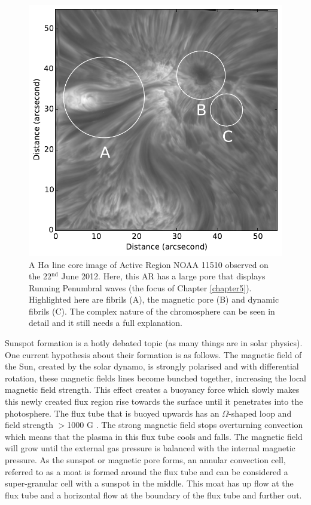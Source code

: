     \begin{figure}
    	\centering
    	\includegraphics[width=\textwidth]{Chromo.pdf}
    	\caption{
    		A H$\alpha$ line core image of Active Region NOAA 11510 observed on the 22$^{\mathrm{nd}}$ June 2012.
    		Here, this AR has a large pore that displays Running Penumbral waves (the focus of Chapter \ref{chapter5}).
    		Highlighted here are fibrils (A), the magnetic pore (B) and dynamic fibrils (C).
    		The complex nature of the chromosphere can be seen in detail and it still needs a full explanation.
    	}
    	\label{fig:chromosphere}
    \end{figure}   
    	
    Sunspot formation is a hotly debated topic (as many things are in solar physics).
    One current hypothesis about their formation is as follows.
    The magnetic field of the Sun, created by the solar dynamo, is strongly polarised and with differential rotation, these magnetic fields lines become bunched together, increasing the local magnetic field strength.
    This effect creates a buoyancy force which slowly makes this newly created flux region rise towards the surface until it penetrates into the photosphere.
    The flux tube that is buoyed upwards has an $\Omega$-shaped loop and field strength $>$1000 G \citep{stix2004sun,2014SoPh..289.3351T}.
    The strong magnetic field stops overturning convection which means that the plasma in this flux tube cools and falls. 
    The magnetic field will grow until the external gas pressure is balanced with the internal magnetic pressure.
    As the sunspot or magnetic pore forms, an annular convection cell, referred to as a moat is formed around the flux tube and can be considered a super-granular cell with a sunspot in the middle.
    This moat has up flow at the flux tube and a horizontal flow at the boundary of the flux tube and further out.
    
